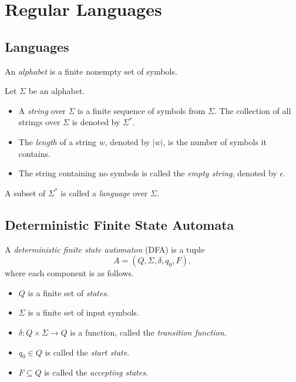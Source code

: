 \chapter{Regular Languages}
\section{Languages}
\begin{definition}
  \label{def:alphabet}
  An \emph{alphabet} is a finite nonempty set of symbols.
\end{definition}

\begin{definition}
  \label{def:string}
  Let $\Sigma$ be an alphabet.
  \begin{itemize}
    \item A \emph{string} over $\Sigma$ is a finite sequence of symbols from
    $\Sigma$.
    The collection of all strings over $\Sigma$ is denoted by $\Sigma^*$.
    \item The \emph{length} of a string $w$, denoted by $|w|$, is the number of
    symbols it contains.
    \item The string containing no symbols is called the \emph{empty string},
    denoted by $\epsilon$.
  \end{itemize}
\end{definition}

\begin{definition}
  \label{def:language}
  A subset of $\Sigma^*$ is called a \emph{language} over $\Sigma$.
\end{definition}

\section{Deterministic Finite State Automata}
\begin{definition}
  \label{def:dfa}
  A \emph{deterministic finite state automaton} (DFA) is a tuple
  \begin{equation*}
    A = (Q, \Sigma, \delta, q_0, F),
  \end{equation*}
  where each component is as follows.
  \begin{itemize}
    \item $Q$ is a finite set of \emph{states}.
    \item $\Sigma$ is a finite set of input symbols.
    \item $\delta: Q \times \Sigma \to Q$ is a function, called the
    \emph{transition function}.
    \item $q_0 \in Q$ is called the \emph{start state}.
    \item $F \subseteq Q$ is called the \emph{accepting states}.
  \end{itemize}
\end{definition}

